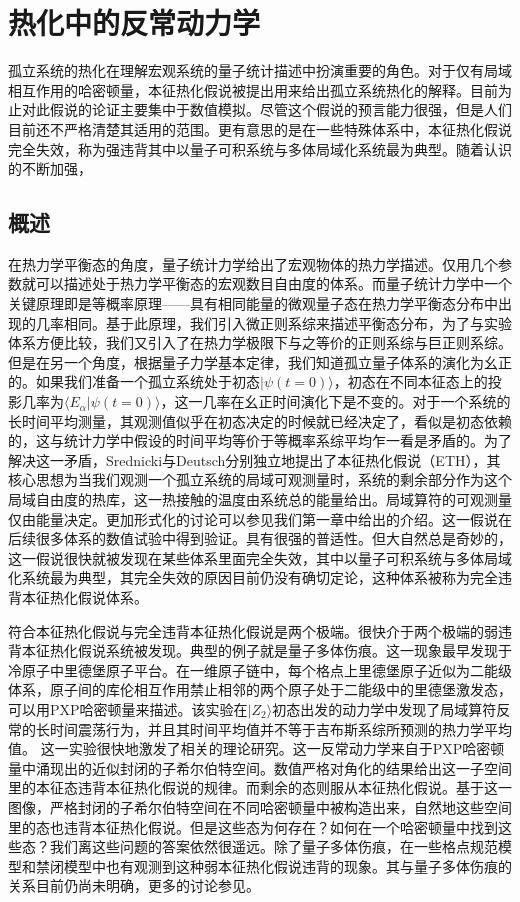 \chapter{热化中的反常动力学}\label{chap:summaryandoutlook}

孤立系统的热化在理解宏观系统的量子统计描述中扮演重要的角色。对于仅有局域相互作用的哈密顿量，本征热化假说被提出用来给出孤立系统热化的解释。目前为止对此假说的论证主要集中于数值模拟。尽管这个假说的预言能力很强，但是人们目前还不严格清楚其适用的范围。更有意思的是在一些特殊体系中，本征热化假说完全失效，称为强违背其中以量子可积系统与多体局域化系统最为典型。随着认识的不断加强，

\section{概述}
在热力学平衡态的角度，量子统计力学给出了宏观物体的热力学描述。仅用几个参数就可以描述处于热力学平衡态的宏观数目自由度的体系。而量子统计力学中一个关键原理即是等概率原理——具有相同能量的微观量子态在热力学平衡态分布中出现的几率相同。基于此原理，我们引入微正则系综来描述平衡态分布，为了与实验体系方便比较，我们又引入了在热力学极限下与之等价的正则系综与巨正则系综。但是在另一个角度，根据量子力学基本定律，我们知道孤立量子体系的演化为幺正的。如果我们准备一个孤立系统处于初态$|\psi(t=0)\rangle$，初态在不同本征态上的投影几率为$\langle E_\alpha|\psi(t=0)\rangle$，这一几率在幺正时间演化下是不变的。对于一个系统的长时间平均测量，其观测值似乎在初态决定的时候就已经决定了，看似是初态依赖的，这与统计力学中假设的时间平均等价于等概率系综平均乍一看是矛盾的。为了解决这一矛盾，Srednicki\cite{Srednicki1994chaos}与Deutsch\cite{Deutsch1991quantum}分别独立地提出了本征热化假说（ETH），其核心思想为当我们观测一个孤立系统的局域可观测量时，系统的剩余部分作为这个局域自由度的热库，这一热接触的温度由系统总的能量给出。局域算符的可观测量仅由能量决定。更加形式化的讨论可以参见我们第一章中给出的介绍。这一假说在后续很多体系的数值试验中得到验证\cite{d2016quantum,deutsch2018eigenstate,rigol2008thermalization,Kim2014testing,}。具有很强的普适性。但大自然总是奇妙的，这一假说很快就被发现在某些体系里面完全失效，其中以量子可积系统与多体局域化系统\cite{basko2006problem}最为典型，其完全失效的原因目前仍没有确切定论，这种体系被称为完全违背本征热化假说体系。

符合本征热化假说与完全违背本征热化假说是两个极端。很快介于两个极端的弱违背本征热化假说系统被发现。典型的例子就是量子多体伤痕。这一现象最早发现于冷原子中里德堡原子平台。在一维原子链中，每个格点上里德堡原子近似为二能级体系，原子间的库伦相互作用禁止相邻的两个原子处于二能级中的里德堡激发态，可以用PXP哈密顿量来描述。该实验在$|Z_2\rangle$初态出发的动力学中发现了局域算符反常的长时间震荡行为，并且其时间平均值并不等于吉布斯系综所预测的热力学平均值。
这一实验很快地激发了相关的理论研究。这一反常动力学来自于PXP哈密顿量中涌现出的近似封闭的子希尔伯特空间。数值严格对角化的结果给出这一子空间里的本征态违背本征热化假说的规律。而剩余的态则服从本征热化假说。基于这一图像，严格封闭的子希尔伯特空间在不同哈密顿量中被构造出来，自然地这些空间里的态也违背本征热化假说。但是这些态为何存在？如何在一个哈密顿量中找到这些态？我们离这些问题的答案依然很遥远。除了量子多体伤痕，在一些格点规范模型和禁闭模型中也有观测到这种弱本征热化假说违背的现象。其与量子多体伤痕的关系目前仍尚未明确，更多的讨论参见。



